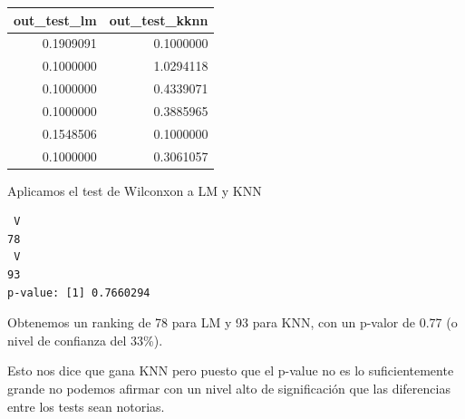 \documentclass[
]{article}
\newenvironment{Shaded}{\begin{snugshade}}{\end{snugshade}}
\newcommand{\CommentTok}[1]{\textcolor[rgb]{0.56,0.35,0.01}{\textit{#1}}}
\newcommand{\DataTypeTok}[1]{\textcolor[rgb]{0.13,0.29,0.53}{#1}}
\newcommand{\DecValTok}[1]{\textcolor[rgb]{0.00,0.00,0.81}{#1}}
\newcommand{\KeywordTok}[1]{\textcolor[rgb]{0.13,0.29,0.53}{\textbf{#1}}}
\newcommand{\NormalTok}[1]{#1}
\newcommand{\OperatorTok}[1]{\textcolor[rgb]{0.81,0.36,0.00}{\textbf{#1}}}
\newcommand{\OtherTok}[1]{\textcolor[rgb]{0.56,0.35,0.01}{#1}}
\newcommand{\StringTok}[1]{\textcolor[rgb]{0.31,0.60,0.02}{#1}}
\begin{document}
\begin{longtable}[]{@{}rr@{}}
\toprule
out\_test\_lm & out\_test\_kknn\tabularnewline
\midrule
\endhead
0.1909091 & 0.1000000\tabularnewline
0.1000000 & 1.0294118\tabularnewline
0.1000000 & 0.4339071\tabularnewline
0.1000000 & 0.3885965\tabularnewline
0.1548506 & 0.1000000\tabularnewline
0.1000000 & 0.3061057\tabularnewline
\bottomrule
\end{longtable}

Aplicamos el test de Wilconxon a LM y KNN

\begin{Shaded}
\end{Shaded}

\begin{verbatim}
 V 
78 
 V 
93 
p-value: [1] 0.7660294
\end{verbatim}

Obtenemos un ranking de 78 para LM y 93 para KNN, con un p-valor de 0.77
(o nivel de confianza del 33\%).

Esto nos dice que gana KNN pero puesto que el p-value no es lo
suficientemente grande no podemos afirmar con un nivel alto de
significación que las diferencias entre los tests sean notorias.
\end{document}
